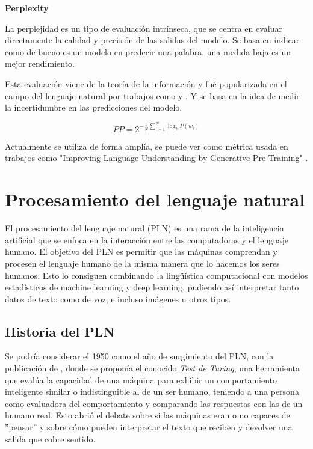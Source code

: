 \textbf{Perplexity}

La perplejidad es un tipo de evaluación intrínseca, que se centra en evaluar directamente la calidad y precisión de las salidas del modelo. Se basa en indicar como de bueno es un modelo en predecir una palabra, una medida baja es un mejor rendimiento.

Esta evaluación viene de la teoría de la información y  fué popularizada en el campo del lenguaje natural por trabajos como \cite{jelinek1976continuous} y \cite{brown1990statistical}. Y se basa en la idea de medir la incertidumbre en las predicciones del modelo.

\[
PP = 2^{-\frac{1}{N} \sum_{i=1}^N \log_2 P(w_i)}
\]

Actualmente se utiliza de forma amplía, se puede ver como métrica usada en trabajos como "Improving Language Understanding by Generative Pre-Training" \cite{radford2018improving}. 


\section{Procesamiento del lenguaje natural}

El procesamiento del lenguaje natural (PLN) es una rama de la inteligencia artificial que se enfoca en la interacción entre las computadoras y el lenguaje humano. El objetivo del PLN es permitir que las máquinas comprendan y procesen el lenguaje humano de la misma manera que lo hacemos los seres humanos. Esto lo consiguen combinando la lingüística computacional con modelos estadísticos de machine learning y deep learning, pudiendo así interpretar tanto datos de texto como de voz, e incluso imágenes u otros tipos.

\subsection{Historia del PLN}

Se podría considerar el 1950 como el año de surgimiento del PLN, con la publicación de \cite{10.1093/mind/LIX.236.433}, donde se proponía el conocido \textit{Test de Turing}, una herramienta que evalúa la capacidad de una máquina para exhibir un comportamiento inteligente similar o indistinguible al de un ser humano, teniendo a una persona como evaluadora del comportamiento y comparando las respuestas con las de un humano real. Esto abrió el debate sobre si las máquinas eran o no capaces de ''pensar'' y sobre cómo pueden interpretar el texto que reciben y devolver una salida que cobre sentido.

